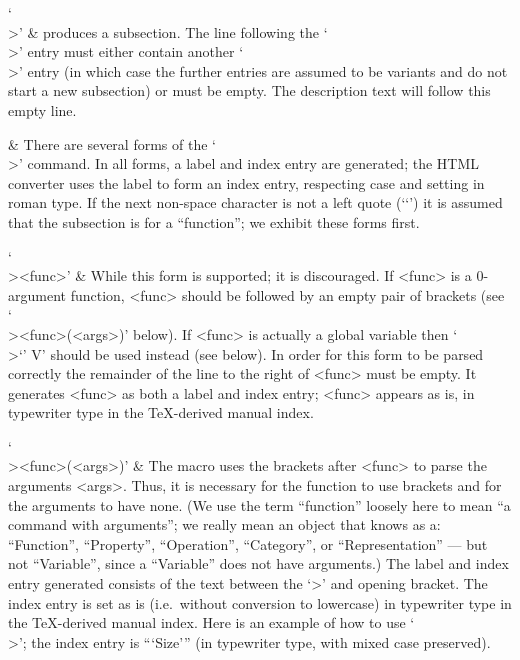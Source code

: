`\\>' &
    produces a subsection.
    The line following the `\\>' entry must either contain another `\\>'
    entry (in which case the further entries are assumed to be variants
    and do not start a new subsection) or must be empty.
    The description text will follow this empty line.

  & There are several forms of the `\\>' command.
    In all forms, a label and index entry are generated; the HTML
    converter uses the label to form an index entry, respecting case
    and setting in roman type.
    If the next non-space character is not a left quote (`\lq') it is
    assumed that the subsection is for a ``function''; we exhibit
    these forms first.

`\\><func>' &
    While this form is supported; it  is  discouraged.  If  <func>  is  a
    0-argument function, <func> should be followed by an  empty  pair  of
    brackets (see `\\><func>(<args>)' below). If  <func>  is  actually  a
    global variable  then  `\\>\lq<global-var>{\rq}  V'  should  be  used
    instead (see below). In order for this form to  be  parsed  correctly
    the remainder of the line to the right of <func> must  be  empty.  It
    generates <func> as both a label and index entry; <func>  appears  as
    is, in typewriter type in the {\TeX}-derived manual index.

`\\><func>(<args>)' &
    The macro uses the brackets  after  <func>  to  parse  the  arguments
    <args>. Thus, it is necessary for the function to  use  brackets  and
    for the arguments to have none. (We use the term ``function'' loosely
    here to mean ``a {\GAP} command with arguments''; we really  mean  an
    object  that  {\GAP}  knows   as   a:   ``Function'',   ``Property'',
    ``Operation'',  ``Category'',  or  ``Representation''  ---  but   not
    ``Variable'', since a ``Variable''  does  not  have  arguments.)  The
    label and index entry generated consists of the text between the  `>'
    and opening bracket. The index entry is  set  as  is  (i.e.\  without
    conversion to lowercase) in typewriter  type  in  the  {\TeX}-derived
    manual index. Here is an example of how to use `\\>'; the index entry
    is ```Size'''  (in  typewriter  type,  with  mixed  case  preserved).

